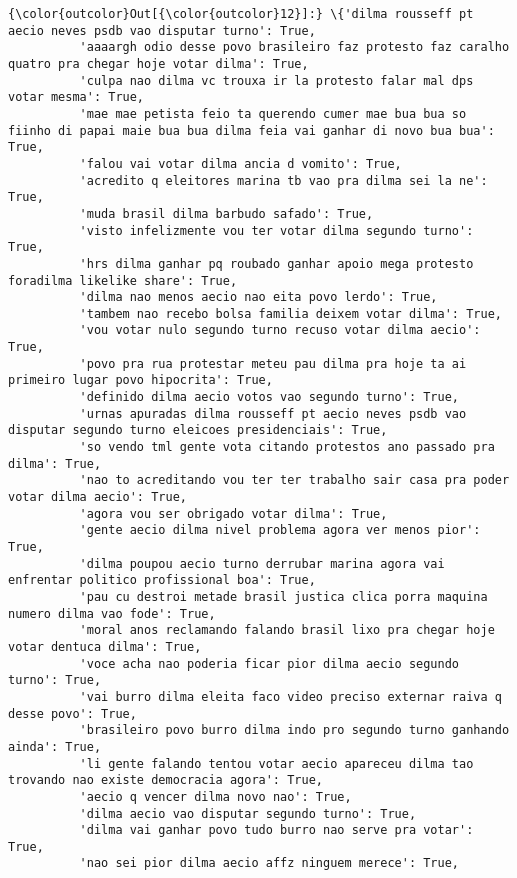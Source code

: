 \documentclass[11pt]{article}
\begin{document}
\begin{Verbatim}[commandchars=\\\{\}]
{\color{outcolor}Out[{\color{outcolor}12}]:} \{'dilma rousseff pt aecio neves psdb vao disputar turno': True,
          'aaaargh odio desse povo brasileiro faz protesto faz caralho quatro pra chegar hoje votar dilma': True,
          'culpa nao dilma vc trouxa ir la protesto falar mal dps votar mesma': True,
          'mae mae petista feio ta querendo cumer mae bua bua so fiinho di papai maie bua bua dilma feia vai ganhar di novo bua bua': True,
          'falou vai votar dilma ancia d vomito': True,
          'acredito q eleitores marina tb vao pra dilma sei la ne': True,
          'muda brasil dilma barbudo safado': True,
          'visto infelizmente vou ter votar dilma segundo turno': True,
          'hrs dilma ganhar pq roubado ganhar apoio mega protesto foradilma likelike share': True,
          'dilma nao menos aecio nao eita povo lerdo': True,
          'tambem nao recebo bolsa familia deixem votar dilma': True,
          'vou votar nulo segundo turno recuso votar dilma aecio': True,
          'povo pra rua protestar meteu pau dilma pra hoje ta ai primeiro lugar povo hipocrita': True,
          'definido dilma aecio votos vao segundo turno': True,
          'urnas apuradas dilma rousseff pt aecio neves psdb vao disputar segundo turno eleicoes presidenciais': True,
          'so vendo tml gente vota citando protestos ano passado pra dilma': True,
          'nao to acreditando vou ter ter trabalho sair casa pra poder votar dilma aecio': True,
          'agora vou ser obrigado votar dilma': True,
          'gente aecio dilma nivel problema agora ver menos pior': True,
          'dilma poupou aecio turno derrubar marina agora vai enfrentar politico profissional boa': True,
          'pau cu destroi metade brasil justica clica porra maquina numero dilma vao fode': True,
          'moral anos reclamando falando brasil lixo pra chegar hoje votar dentuca dilma': True,
          'voce acha nao poderia ficar pior dilma aecio segundo turno': True,
          'vai burro dilma eleita faco video preciso externar raiva q desse povo': True,
          'brasileiro povo burro dilma indo pro segundo turno ganhando ainda': True,
          'li gente falando tentou votar aecio apareceu dilma tao trovando nao existe democracia agora': True,
          'aecio q vencer dilma novo nao': True,
          'dilma aecio vao disputar segundo turno': True,
          'dilma vai ganhar povo tudo burro nao serve pra votar': True,
          'nao sei pior dilma aecio affz ninguem merece': True,

\end{Verbatim}
\end{document}
